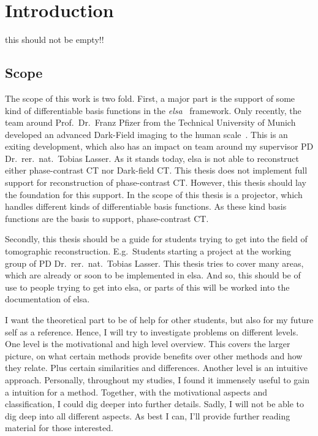 \chapter{Introduction}

this should not be empty!!

\section{Scope}

The scope of this work is two fold. First, a major part is the support of some kind of
differentiable basis functions in the \textit{elsa}~\cite{lasser_elsa_2019} framework. Only
recently, the team around Prof.\ Dr.\ Franz Pfizer from the Technical University of Munich developed
an advanced Dark-Field imaging to the human scale~\cite{viermetz_dark-field_2022}. This is an
exiting development, which also has an impact on team around my supervisor PD Dr.\ rer.\ nat.\
Tobias Lasser. As it stands today, elsa is not able to reconstruct either phase-contrast CT nor Dark-field
CT\@. This thesis does not implement full support for reconstruction of phase-contrast CT\@.
However, this thesis should lay the foundation for this support. In the scope of this thesis is a
projector, which handles different kinds of differentiable basis functions. As these kind basis
functions are the basis to support, phase-contrast CT\@.

Secondly, this thesis should be a guide for students trying to get into the field of tomographic
reconstruction. E.g.\ Students starting a project at the working group of PD Dr.\ rer.\ nat.\ Tobias
Lasser. This thesis tries to cover many areas, which are already or soon to be implemented in elsa.
And so, this should be of use to people trying to get into elsa, or parts of this will be worked
into the documentation of elsa.

I want the theoretical part to be of help for other students, but also for my future self as a
reference. Hence, I will try to investigate problems on different levels. One level is the
motivational and high level overview. This covers the larger picture, on what certain methods
provide benefits over other methods and how they relate. Plus certain similarities and differences.
Another level is an intuitive approach. Personally, throughout my studies, I found it immensely
useful to gain a intuition for a method. Together, with the motivational aspects and classification,
I could dig deeper into further details. Sadly, I will not be able to dig deep into all different
aspects. As best I can, I'll provide further reading material for those interested.


